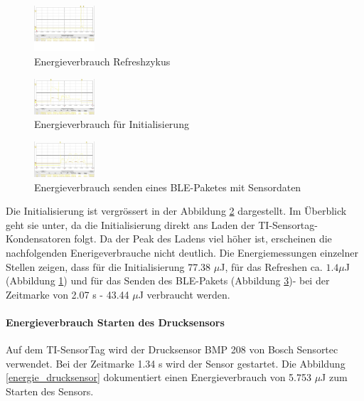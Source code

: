 \newpage
\begin{figure}[ht]
  \includegraphics[width=0.2\textwidth]{3Vorgehen/imag/Refresh.png}
  \caption{Energieverbrauch Refreshzykus}
  \label{energie_refresh}
\end{figure}

\newpage
\begin{figure}[ht]
  \includegraphics[width=0.2\textwidth]{3Vorgehen/imag/Init.png}
  \caption{Energieverbrauch für Initialisierung}
  \label{energie_init}
\end{figure}


\begin{figure}[ht]
  \includegraphics[width=0.2\textwidth]{3Vorgehen/imag/Senden.png}
  \caption{Energieverbrauch senden eines BLE-Paketes mit Sensordaten}
  \label{energie_senden}
\end{figure}


Die Initialisierung ist vergrössert in der Abbildung  \ref{energie_init} dargestellt. Im Überblick geht sie unter, da die Initialisierung direkt ans Laden der TI-Sensortag-Kondensatoren folgt. Da der Peak des Ladens viel höher ist, erscheinen die nachfolgenden Enerigeverbrauche nicht deutlich. Die Energiemessungen einzelner Stellen zeigen, dass für die Initialisierung 77.38 $\mu$J, für das Refreshen ca. $1.4\mu$J (Abbildung \ref{energie_refresh}) und für das Senden des BLE-Pakets (Abbildung \ref{energie_senden})- bei der Zeitmarke von 2.07 s - 43.44 $\mu$J verbraucht werden.


\paragraph{Energieverbrauch Starten des Drucksensors}

Auf dem TI-SensorTag wird der Drucksensor BMP 208 von Bosch Sensortec verwendet. Bei der Zeitmarke 1.34 s wird der Sensor gestartet. Die Abbildung \ref{energie_drucksensor} dokumentiert einen Energieverbrauch von 5.753 $\mu$J zum Starten des Sensors.

